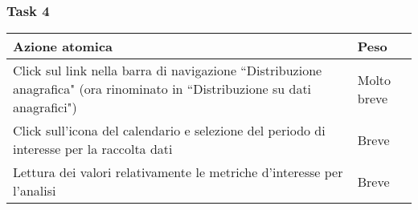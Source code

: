 \subsubsection{Task 4}
\label{sss:iaa-task-4}

{
\renewcommand{\arraystretch}{2}
\begin{longtable}[h]{| p{14cm} | p{2.5cm} |}
    \hline
    \textbf{Azione atomica} & \textbf{Peso} \\
    \hline
    \endhead
    Click sul link nella barra di navigazione ``Distribuzione anagrafica" (ora rinominato in ``Distribuzione su dati anagrafici") & Molto breve \\
    \hline
    Click sull'icona del calendario e selezione del periodo di interesse per la raccolta dati & Breve \\
    \hline
    Lettura dei valori relativamente le metriche d'interesse per l'analisi & Breve \\
    \hline
\end{longtable}
}
